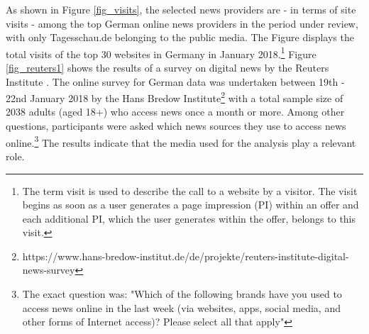 \documentclass[12pt,a4paper,notitlepage]{article}
\begin{document}
As shown in Figure \ref{fig_visits}, the selected news providers are - in terms of site visits - among the top German online news providers in the period under review, with only Tagesschau.de belonging to the public media. The Figure displays the total visits of the top 30 websites in Germany in January 2018.\footnote{The term visit is used to describe the call to a website by a visitor. The visit begins as soon as a user generates a page impression (PI) within an offer and each additional PI, which the user generates within the offer, belongs to this visit.} Figure \ref{fig_reuters1} shows the results of a survey on digital news by the Reuters Institute \citep{newman_reuters_2018}. The online survey for German data was undertaken between 19th - 22nd January 2018 by the Hans Bredow Institute\footnote{https://www.hans-bredow-institut.de/de/projekte/reuters-institute-digital-news-survey} with a total sample size of 2038 adults (aged 18+) who access news once a month or more. Among other questions, participants were asked which news sources they use to access news online.\footnote{The exact question was: "Which of the following brands have you used to access news online in the last week (via websites, apps, social media, and other forms of Internet access)? Please select all that apply"} The results indicate that the media used for the analysis play a relevant role.
\end{document}
